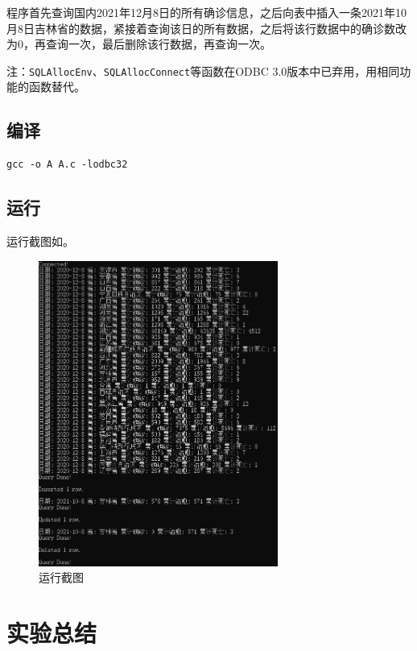 \documentclass[lang=cn,11pt,a4paper,cite=authornum]{paper}
\begin{document}
程序首先查询国内2021年12月8日的所有确诊信息，之后向表中插入一条2021年10月8日吉林省的数据，紧接着查询该日的所有数据，之后将该行数据中的确诊数改为0，再查询一次，最后删除该行数据，再查询一次。

注：\texttt{SQLAllocEnv}、\texttt{SQLAllocConnect}等函数在ODBC 3.0版本中已弃用，用相同功能的函数替代。

\subsection{编译}

\begin{code}
\begin{verbatim}
gcc -o A A.c -lodbc32
\end{verbatim}
\end{code}

\subsection{运行}

运行截图如。

\begin{figure}[!htb]
    \centering
    \includegraphics[width=0.7\textwidth]{./images/running.png}
    \caption{运行截图\label{fig:running}}
\end{figure}

\section{实验总结}
\end{document}

